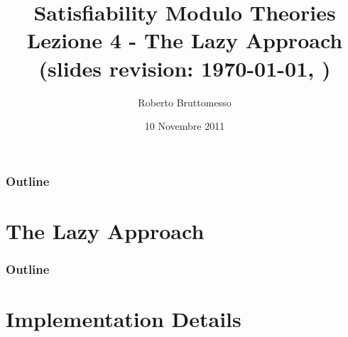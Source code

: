 \documentclass[xcolor=dvipsnames
              ]{beamer}
\title[The Lazy Approach]{Satisfiability Modulo Theories\\ Lezione 4 - The Lazy Approach \\ {\tiny (slides revision: \today, \currenttime)}}
\author[R. Bruttomesso]{\large Roberto Bruttomesso}
\date{10 Novembre 2011}
\institute[SMT]{\large Seminario di Logica Matematica \\(Corso Prof. Silvio Ghilardi)}
\begin{document}
\frame{\titlepage}

\begin{frame}
  \frametitle{Outline}
  \tableofcontents
\end{frame}

\section{The Lazy Approach}





\begin{frame}
  \frametitle{Outline}
  \tableofcontents
\end{frame}

\section{Implementation Details}

\end{document}
